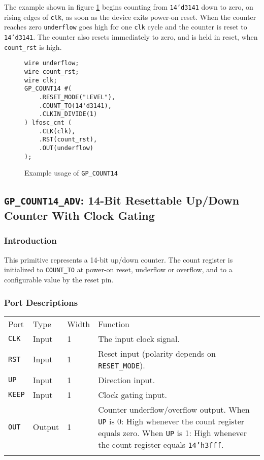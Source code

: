 \documentclass[11pt]{article}
\newcommand{\tokenstyle}[1]{\texttt{#1}}
\newcommand{\wirestyle}[1]{\texttt{#1}}
\newcommand{\datastyle}[1]{\texttt{#1}}
\newcommand{\whenstyle}[1]{{\fontseries{sb}\selectfont#1}}
\newcommand{\thinhline}{\Xhline{1\arrayrulewidth}}
\newcommand{\thickhline}{\Xhline{2.5\arrayrulewidth}}
\begin{document}
The example shown in figure \ref{gp-count14-example} begins counting from \datastyle{14'd3141} down to zero, on
rising edges of \wirestyle{clk}, as soon as the device exits power-on reset. When the counter reaches zero
\wirestyle{underflow} goes high for one \wirestyle{clk} cycle and the counter is reset to \datastyle{14'd3141}.
The counter also resets immediately to zero, and is held in reset, when \wirestyle{count\_rst} is high.

\begin{figure}[h]
\begin{lstlisting}
wire underflow;
wire count_rst;
wire clk;
GP_COUNT14 #(
	.RESET_MODE("LEVEL"),
	.COUNT_TO(14'd3141),
	.CLKIN_DIVIDE(1)
) lfosc_cnt (
	.CLK(clk),
	.RST(count_rst),
	.OUT(underflow)
);
\end{lstlisting}
\caption{Example usage of \tokenstyle{GP\_COUNT14}}
\label{gp-count14-example}
\end{figure}


\pagebreak
\subsection{\tokenstyle{GP\_COUNT14\_ADV}: 14-Bit Resettable Up/Down Counter With Clock Gating}
\label{gp-count14-adv}

\subsubsection{Introduction}
This primitive represents a 14-bit up/down counter. The count register is initialized to \tokenstyle{COUNT\_TO} at
power-on reset, underflow or overflow, and to a configurable value by the reset pin.

\subsubsection{Port Descriptions}

\begin{tabularx}{\textwidth}{lllX}
\thinhline
\whenstyle{Port} & \whenstyle{Type} & \whenstyle{Width} & \whenstyle{Function} \\
\thickhline
\tokenstyle{CLK} & Input & 1 & The input clock signal. \\
\thinhline
\tokenstyle{RST} & Input & 1 & Reset input (polarity depends on \tokenstyle{RESET\_MODE}). \\
\thinhline
\tokenstyle{UP} & Input & 1 & Direction input. \\
\thinhline
\tokenstyle{KEEP} & Input & 1 & Clock gating input. \\
\thinhline
\tokenstyle{OUT} & Output & 1 & Counter underflow/overflow output. \newline
	\whenstyle{When \tokenstyle{UP} is 0:} High whenever the count register equals zero. \newline
	\whenstyle{When \tokenstyle{UP} is 1:} High whenever the count register equals \datastyle{14'h3fff}. \\
\thinhline
\end{tabularx}
\end{document}
